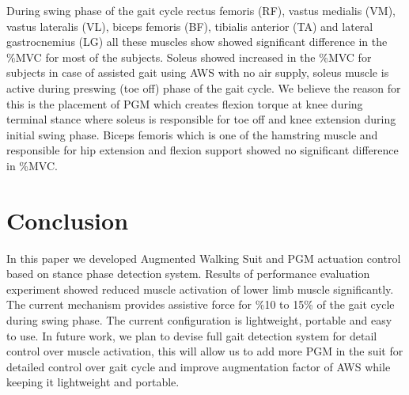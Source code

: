 \documentclass[letterpaper, 10 pt, conference]{ieeeconf}  %
\begin{document}
During swing phase of the gait cycle rectus femoris (RF), vastus medialis (VM), vastus lateralis (VL), biceps femoris (BF), tibialis anterior (TA) and lateral gastrocnemius (LG) all these muscles show showed significant difference in the \%MVC for most of the subjects. Soleus showed increased in the \%MVC for subjects in case of assisted gait using AWS with no air supply, soleus muscle is active during preswing (toe off) phase of the gait cycle. We believe the reason for this is the placement of PGM which creates flexion torque at knee during terminal stance where soleus is responsible for toe off and knee extension during initial swing phase. Biceps femoris which is one of the hamstring muscle and responsible for hip extension and flexion support showed no significant difference in \%MVC. 



\section{Conclusion} \label{conclusion}

In this paper we developed Augmented Walking Suit and PGM actuation control based on stance phase detection system. Results of performance evaluation experiment showed reduced muscle activation of lower limb muscle significantly. The current mechanism provides assistive force for \%10 to 15\% of the gait cycle during swing phase. The current configuration is lightweight, portable and easy to use. In future work, we plan to devise full gait detection system for detail control over muscle activation, this will allow us to add more PGM in the suit for detailed control over gait cycle and improve augmentation factor of AWS while keeping it lightweight and portable.

\addtolength{\textheight}{-12cm}   %







\end{document}
